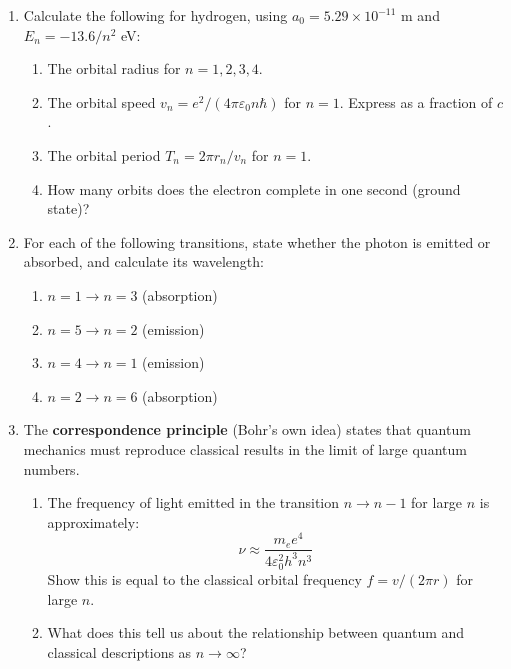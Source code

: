 \documentclass[12pt, a4paper]{book}
\begin{document}
\begin{problembox}
\begin{enumerate}[label=\textbf{\arabic*.}]
  \item Calculate the following for hydrogen, using
        $a_0 = 5.29\times10^{-11}$ m and $E_n = -13.6/n^2$ eV:
        \begin{enumerate}[label=(\alph*)]
          \item The orbital radius for $n = 1, 2, 3, 4$.
          \item The orbital speed $v_n = e^2/(4\pi\varepsilon_0 n\hbar)$
                for $n=1$.
                Express as a fraction of $c$.
          \item The orbital period $T_n = 2\pi r_n / v_n$ for $n=1$.
          \item How many orbits does the electron complete
                in one second (ground state)?
        \end{enumerate}

  \item For each of the following transitions, state whether
        the photon is emitted or absorbed, and calculate
        its wavelength:
        \begin{enumerate}[label=(\alph*)]
          \item $n=1 \to n=3$ (absorption)
          \item $n=5 \to n=2$ (emission)
          \item $n=4 \to n=1$ (emission)
          \item $n=2 \to n=6$ (absorption)
        \end{enumerate}

  \item The \textbf{correspondence principle} (Bohr's own idea)
        states that quantum mechanics must reproduce
        classical results in the limit of large quantum numbers.
        \begin{enumerate}[label=(\alph*)]
          \item The frequency of light emitted in the transition
                $n \to n-1$ for large $n$ is approximately:
                \[
                  \nu \approx \frac{m_e e^4}{4\varepsilon_0^2 h^3 n^3}
                \]
                Show this is equal to the classical orbital
                frequency $f = v/(2\pi r)$ for large $n$.
          \item What does this tell us about the relationship
                between quantum and classical descriptions
                as $n \to \infty$?
        \end{enumerate}
\end{enumerate}
\end{problembox}
\end{document}
